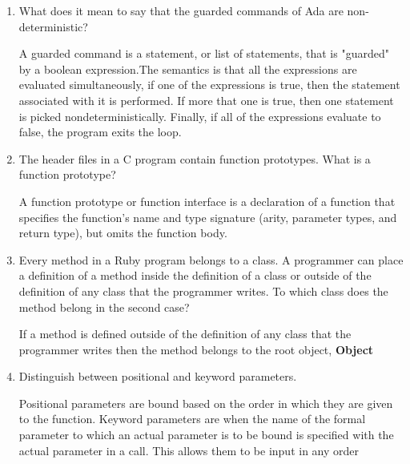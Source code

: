 \begin{enumerate}
\begin{answer}
    \end{answer}
    
  \item What does it mean to say that the guarded commands
    of Ada are non-deterministic?
    
    \begin{answer}
    
    A guarded command is a statement, or list of statements, that is "guarded" by a boolean expression.The semantics is that all the expressions are evaluated simultaneously, if one of the expressions is true, then the statement associated with it is performed. If more that one is true, then one statement is picked nondeterministically. Finally, if all of the expressions evaluate to false, the program exits the loop.
    
    \end{answer}

  \item The header files in a C program contain function
    prototypes. What is a function prototype?
    
    \begin{answer}
    
     A function prototype or function interface is a declaration of a function that specifies the function's name and type signature (arity, parameter types, and return type), but omits the function body.

    \end{answer}

  \item Every method in a Ruby program belongs to a class.
    A programmer can place a definition of a method inside
    the definition of a class or outside of the definition
    of any class that the programmer writes. To which class
    does the method belong in the second case?
    
    \begin{answer}
     If a method is defined outside of the definition of any class that the programmer writes then the method belongs to the root object, \textbf{Object}
    \end{answer}

  \item Distinguish between positional and keyword parameters.
  
  \begin{answer}
  Positional parameters are bound based on the order in which they are given to the function. Keyword parameters are when the name of the formal parameter to which an actual parameter is to be bound is specified with the actual parameter in a call. This allows them to be input in any order
  \end{answer}


\end{enumerate}
